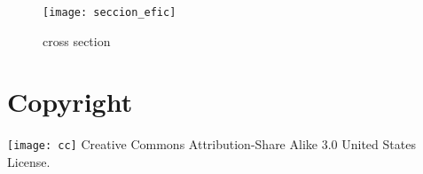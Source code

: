\begin{figure}
  \centering
  \texttt{[image: seccion\_efic]}
  \caption{cross section}
\end{figure}

\section{Copyright}
\texttt{[image: cc]} Creative Commons Attribution-Share Alike 3.0 United States License.





